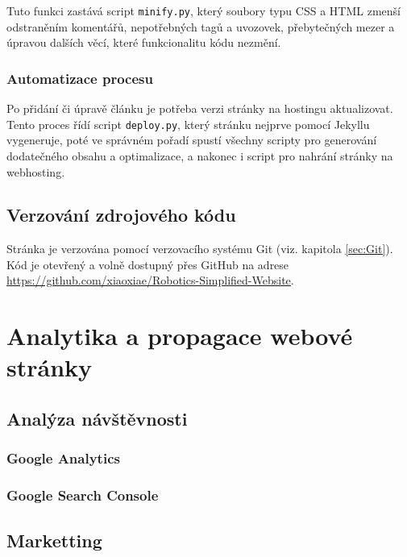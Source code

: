 \documentclass[a4paper, 12pt]{article}
\begin{document}
  Tuto funkci zastává script \texttt{minify.py}, který soubory typu CSS a HTML zmenší odstraněním komentářů, nepotřebných tagů a uvozovek, přebytečných mezer a úpravou dalších věcí, které funkcionalitu kódu nezmění.


  \subsubsection{Automatizace procesu}
  Po přidání či úpravě článku je potřeba verzi stránky na hostingu aktualizovat. Tento proces řídí script \texttt{deploy.py}, který stránku nejprve pomocí Jekyllu vygeneruje, poté ve správném pořadí spustí všechny scripty pro generování dodatečného obsahu a optimalizace, a nakonec i script pro nahrání stránky na webhosting.


  \subsection{Verzování zdrojového kódu}
  Stránka je verzována pomocí verzovacího systému Git (viz. kapitola \ref{sec:Git}). Kód je otevřený a volně dostupný přes GitHub na adrese \url{https://github.com/xiaoxiae/Robotics-Simplified-Website}.


  \section{Analytika a propagace webové stránky}

  \subsection{Analýza návštěvnosti}

  \subsubsection{Google Analytics}

  \subsubsection{Google Search Console}

  \subsection{Marketting}
\end{document}
